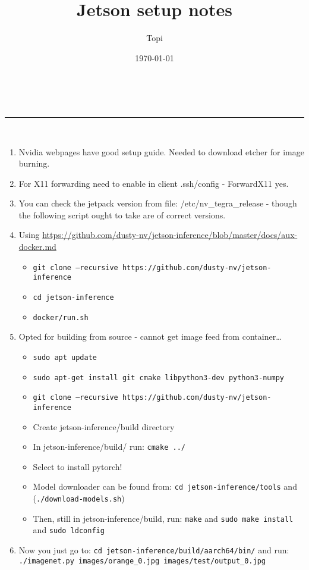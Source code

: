 \documentclass[a4paper,11pt]{article}
\makeatletter
\newcommand{\linia}{\rule{\linewidth}{0.5pt}}
\renewcommand{\maketitle}{
\begin{center}
\vspace{2ex}
{\huge \textsc{\@title}}
\vspace{1ex}
\\
\linia\\
\@author \hfill \@date
\vspace{4ex}
\end{center}
}
\makeatother
\begin{document}
\title{Jetson setup notes}
\author{Topi}
\date{\today}

\maketitle

\begin{enumerate}
	\item Nvidia webpages have good setup guide. Needed to download etcher for image burning. 
	\item For X11 forwarding need to enable in client .ssh/config - ForwardX11 yes.
	\item You can check the jetpack version from file: /etc/nv\_tegra\_release - though the following script ought to take are of correct versions.
	\item Using \url{https://github.com/dusty-nv/jetson-inference/blob/master/docs/aux-docker.md}
	\begin{itemize}
	\item \texttt{git clone --recursive https://github.com/dusty-nv/jetson-inference}
	\item \texttt{cd jetson-inference}	
	\item \texttt{docker/run.sh}
	\end{itemize}
	\item Opted for building from source - cannot get image feed from container\dots
	\begin{itemize}
	\item \texttt{sudo apt update}
	\item \texttt{sudo apt-get install git cmake libpython3-dev python3-numpy}
	\item \texttt{git clone --recursive https://github.com/dusty-nv/jetson-inference}
	\item Create jetson-inference/build directory
	\item In jetson-inference/build/ run: \texttt{cmake ../}
	\item Select to install pytorch!
	\item Model downloader can be found from: \texttt{cd jetson-inference/tools} and (\texttt{./download-models.sh})
	\item Then, still in jetson-inference/build, run: \texttt{make} and \texttt{sudo make install} and \texttt{sudo ldconfig}
	\end{itemize}
	\item Now you just go to: \texttt{cd jetson-inference/build/aarch64/bin/} and run: \texttt{./imagenet.py images/orange\_0.jpg images/test/output\_0.jpg}

\end{enumerate}
\end{document}
